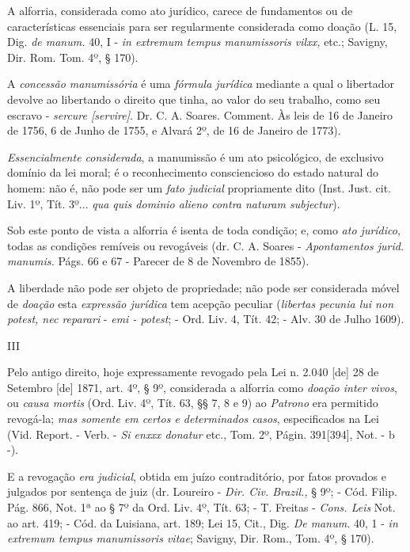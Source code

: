 A alforria, considerada como ato jurídico, carece de fundamentos ou de
características essenciais para ser regularmente considerada como doação
(L. 15, Dig. \emph{de manum.} 40, I - \emph{in extremum tempus
manumissoris vilxx,} etc.; Savigny, Dir. Rom. Tom. 4º, § 170).

A \emph{concessão manumissória} é uma \emph{fórmula jurídica} mediante a
qual o libertador devolve ao libertando o direito que tinha, ao valor do
seu trabalho, como seu escravo - \emph{sercure {[}servire{]}}. Dr. C. A.
Soares. Comment. Às leis de 16 de Janeiro de 1756, 6 de Junho de 1755, e
Alvará 2º, de 16 de Janeiro de 1773).

\emph{Essencialmente considerada}, a manumissão é um ato psicológico, de
exclusivo domínio da lei moral; é o reconhecimento consciencioso do
estado natural do homem: não é, não pode ser um \emph{fato judicial}
propriamente dito (Inst. Just. cit. Liv. 1º, Tít. 3º... \emph{qua quis
dominio alieno contra naturam subjectur}).

Sob este ponto de vista a alforria é isenta de toda condição; e, como
\emph{ato jurídico}, todas as condições remíveis ou revogáveis (dr. C.
A. Soares - \emph{Apontamentos jurid. manumis.} Págs. 66 e 67 - Parecer
de 8 de Novembro de 1855).

A liberdade não pode ser objeto de propriedade; não pode ser considerada
móvel de \emph{doação} esta \emph{expressão jurídica} tem acepção
peculiar (\emph{libertas pecunia lui non potest, nec reparari} -
\emph{emi - potest}; - Ord. Liv. 4, Tít. 42; - Alv. 30 de Julho 1609).

III

Pelo antigo direito, hoje expressamente revogado pela Lei n. 2.040
{[}de{]} 28 de Setembro {[}de{]} 1871, art. 4º, § 9º, considerada a
alforria como \emph{doação inter vivos}, ou \emph{causa mortis} (Ord.
Liv. 4º, Tít. 63, §§ 7, 8 e 9) ao \emph{Patrono} era permitido
revogá-la; \emph{mas somente em certos e determinados casos},
especificados na Lei (Vid. Report. - Verb. - \emph{Si enxxx donatur}
etc., Tom. 2º, Págin. 391{[}394{]}, Not. - b -).

E a revogação \emph{era judicial}, obtida em juízo contraditório, por
fatos provados e julgados por sentença de juiz (dr. Loureiro -
\emph{Dir. Civ. Brazil.,} § 9º; - Cód. Filip. Pág. 866, Not. 1ª ao § 7º
da Ord. Liv. 4º, Tít. 63; - T. Freitas - \emph{Cons. Leis} Not. ao art.
419; - Cód. da Luisiana, art. 189; Lei 15, Cit., Dig. \emph{De manum.}
40, 1 - \emph{in extremum tempus manumissoris vitae}; Savigny, Dir.
Rom., Tom. 4º, § 170).

